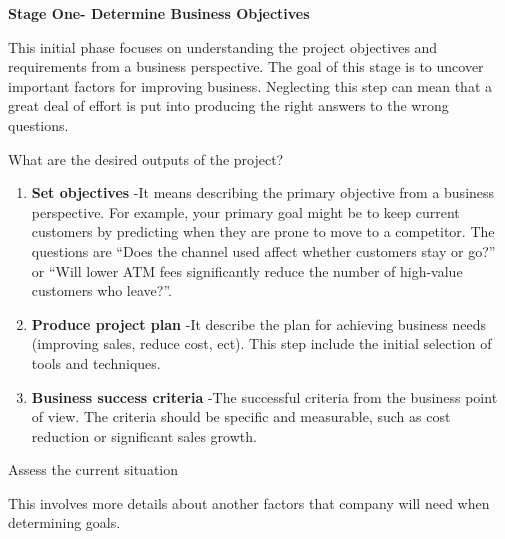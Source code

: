 \documentclass[]{book}
\begin{document}
\textbf{Stage One- Determine Business Objectives }

This initial phase focuses on understanding the project objectives and
requirements from a business perspective. The goal of this stage is to
uncover important factors for improving business. Neglecting this step
can mean that a great deal of effort is put into producing the right
answers to the wrong questions.

What are the desired outputs of the project?

\begin{enumerate}
\def\labelenumi{\arabic{enumi}.}
\item
  \textbf{Set objectives }-It means describing the primary objective
  from a business perspective. For example, your primary goal might be
  to keep current customers by predicting when they are prone to move to
  a competitor. The questions are ``Does the channel used affect whether
  customers stay or go?'' or ``Will lower ATM fees significantly reduce
  the number of high-value customers who leave?''.
\item
  \textbf{Produce project plan }-It describe the plan for achieving
  business needs (improving sales, reduce cost, ect). This step include
  the initial selection of tools and techniques.
\item
  \textbf{Business success criteria }-The successful criteria from the
  business point of view. The criteria should be specific and
  measurable, such as cost reduction or significant sales growth.
\end{enumerate}

Assess the current situation

This involves more details about another factors that company will need
when determining goals.
\end{document}
